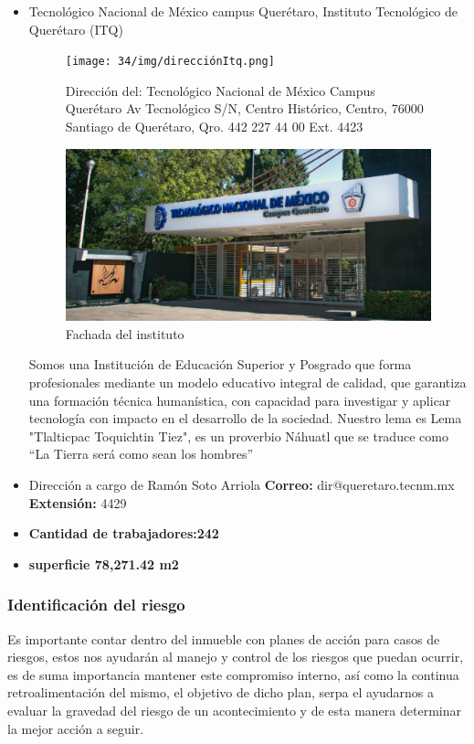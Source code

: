     \begin{itemize}
        \item Tecnológico Nacional de México campus Querétaro, Instituto Tecnológico de Querétaro (ITQ)
    \begin{figure}[H]
        \centering
        \texttt{[image: 34/img/direcciónItq.png]}
        \caption{Dirección del: Tecnológico Nacional de México Campus Querétaro Av Tecnológico S/N, Centro Histórico, Centro, 76000 Santiago de Querétaro, Qro. 442 227 44 00 Ext. 4423}
        \label{fig:enter-label7}
    \end{figure}
    \begin{figure}[H]
        \centering
        \includegraphics[scale=0.3]{34/img/itq.png}
        \caption{Fachada del instituto}
        \label{fig:enter-label8}
    \end{figure}
    Somos una Institución de Educación Superior y Posgrado que forma profesionales mediante un modelo educativo integral de calidad, que garantiza una formación técnica humanística, con capacidad para investigar y aplicar tecnología con impacto en el desarrollo de la sociedad. Nuestro lema es Lema "Tlalticpac Toquichtin Tiez", es un proverbio Náhuatl que se traduce como “La Tierra será como sean los hombres” 
    
    \item Dirección a cargo de Ramón Soto Arriola	\textbf{Correo:} dir@queretaro.tecnm.mx	\textbf{Extensión:} 4429
    \item \textbf{Cantidad de trabajadores:242}
    \item \textbf{superficie 78,271.42 m2}
    \end{itemize}
    \subsubsection{Identificación del riesgo}
    Es importante contar dentro del inmueble con planes de acción para casos de riesgos, estos nos ayudarán al manejo y control de los riesgos que puedan ocurrir, es de suma importancia mantener este compromiso interno, así como la continua retroalimentación del mismo, el objetivo de dicho plan, serpa el ayudarnos a evaluar la gravedad del riesgo de un acontecimiento y de esta manera determinar la mejor acción a seguir.
    
